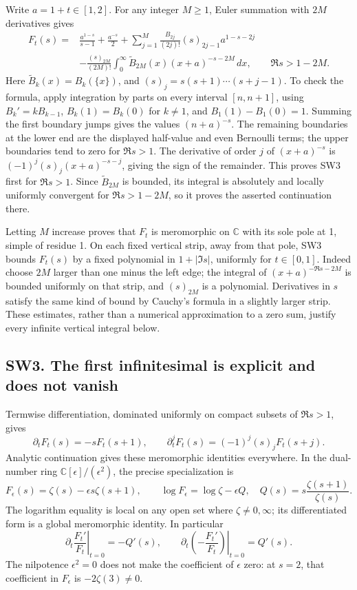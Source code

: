 \documentclass[
  10pt,
  a4paper,
]{article}
\begin{document}
Write \(a=1+t\in[1,2]\). For any integer \(M\ge1\), Euler summation with
\(2M\) derivatives gives \[
\begin{aligned}
F_t(s)={}&\frac{a^{1-s}}{s-1}+\frac{a^{-s}}2
 +\sum_{j=1}^{M}\frac{B_{2j}}{(2j)!}(s)_{2j-1}a^{1-s-2j}\\
&-\frac{(s)_{2M}}{(2M)!}
\int_0^\infty \widetilde B_{2M}(x)(x+a)^{-s-2M}\,dx,
\qquad \Re s>1-2M.
\end{aligned}
\tag{SW3}
\] Here \(\widetilde B_k(x)=B_k(\{x\})\), and
\((s)_j=s(s+1)\cdots(s+j-1)\). To check the formula, apply integration
by parts on every interval \([n,n+1]\), using \(B_k'=kB_{k-1}\),
\(B_k(1)=B_k(0)\) for \(k\ne1\), and \(B_1(1)-B_1(0)=1\). Summing the
first boundary jumps gives the values \((n+a)^{-s}\). The remaining
boundaries at the lower end are the displayed half-value and even
Bernoulli terms; the upper boundaries tend to zero for \(\Re s>1\). The
derivative of order \(j\) of \((x+a)^{-s}\) is
\((-1)^j(s)_j(x+a)^{-s-j}\), giving the sign of the remainder. This
proves SW3 first for \(\Re s>1\). Since \(\widetilde B_{2M}\) is
bounded, its integral is absolutely and locally uniformly convergent for
\(\Re s>1-2M\), so it proves the asserted continuation there.

Letting \(M\) increase proves that \(F_t\) is meromorphic on
\(\mathbb C\) with its sole pole at 1, simple of residue 1. On each
fixed vertical strip, away from that pole, SW3 bounds \(F_t(s)\) by a
fixed polynomial in \(1+|\Im s|\), uniformly for \(t\in[0,1]\). Indeed
choose \(2M\) larger than one minus the left edge; the integral of
\((x+a)^{-\Re s-2M}\) is bounded uniformly on that strip, and
\((s)_{2M}\) is a polynomial. Derivatives in \(s\) satisfy the same kind
of bound by Cauchy's formula in a slightly larger strip. These
estimates, rather than a numerical approximation to a zero sum, justify
every infinite vertical integral below.

\subsection{SW3. The first infinitesimal is explicit and does not
vanish}\label{sw3.-the-first-infinitesimal-is-explicit-and-does-not-vanish}

Termwise differentiation, dominated uniformly on compact subsets of
\(\Re s>1\), gives \[
\partial_t F_t(s)=-sF_t(s+1),\qquad
\partial_t^jF_t(s)=(-1)^j(s)_j F_t(s+j).
\tag{SW4}
\] Analytic continuation gives these meromorphic identities everywhere.
In the dual-number ring \(\mathbb C[\epsilon]/(\epsilon^2)\), the
precise specialization is \[
F_\epsilon(s)=\zeta(s)-\epsilon s\zeta(s+1),\qquad
\log F_\epsilon=\log\zeta-\epsilon Q,
\quad Q(s)=s\frac{\zeta(s+1)}{\zeta(s)}.
\tag{SW5}
\] The logarithm equality is local on any open set where
\(\zeta\ne0,\infty\); its differentiated form is a global meromorphic
identity. In particular \[
\left.\partial_t\frac{F_t'}{F_t}\right|_{t=0}=-Q'(s),
\qquad
\left.\partial_t\left(-\frac{F_t'}{F_t}\right)\right|_{t=0}=Q'(s).
\tag{SW6}
\] The nilpotence \(\epsilon^2=0\) does not make the coefficient of
\(\epsilon\) zero: at \(s=2\), that coefficient in \(F_\epsilon\) is
\(-2\zeta(3)\ne0\).
\end{document}
